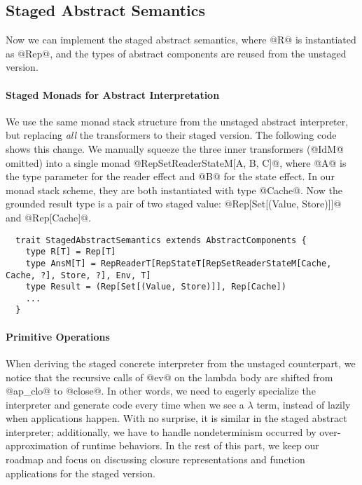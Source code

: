 \subsection{Staged Abstract Semantics}

Now we can implement the staged abstract semantics, where @R@ is instantiated as
@Rep@, and the types of abstract components are reused from the unstaged version.

\paragraph{Staged Monads for Abstract Interpretation}
We use the same monad stack structure from the unstaged abstract interpreter,
but replacing \textit{all} the transformers to their staged version. The
following code shows this change. We manually squeeze the three inner
transformers (@IdM@ omitted) into a single monad @RepSetReaderStateM[A, B, C]@,
where @A@ is the type parameter for the reader effect and @B@ for the state effect.
In our monad stack scheme, they are both instantiated with type @Cache@. Now the
grounded result type is a pair of two staged value: @Rep[Set[(Value, Store)]]@ and
@Rep[Cache]@.
\begin{lstlisting}
  trait StagedAbstractSemantics extends AbstractComponents {
    type R[T] = Rep[T]
    type AnsM[T] = RepReaderT[RepStateT[RepSetReaderStateM[Cache, Cache, ?], Store, ?], Env, T]
    type Result = (Rep[Set[(Value, Store)]], Rep[Cache])
    ...
  }
\end{lstlisting}

\iffalse
Since our monad stack is uniformly using staged data, the staged @SetT@ now
stores a staged value of type @Rep[Set[A]]@, inside of another staged monad @M@.
\begin{lstlisting}
  case class SetT[M[_]: RepMonad, A](run: M[Set[A]]) {
    def flatMap[B: Manifest](f: Rep[A] => SetT[M, B]): SetT[M, B] = ...
  }
\end{lstlisting}
\fi

\paragraph{Primitive Operations} When deriving the staged concrete interpreter
from the unstaged counterpart, we notice that the recursive calls of @ev@ on the
lambda body are shifted from @ap_clo@ to @close@. In other words, we need to
eagerly specialize the interpreter and generate code every time when we see a
$\lambda$ term, instead of lazily when applications happen.
With no surprise, it is similar in the staged abstract interpreter;
additionally, we have to handle nondeterminism occurred by over-approximation
of runtime behaviors.
In the rest of this part, we keep our roadmap and focus on discussing closure
representations and function applications for the staged version.

